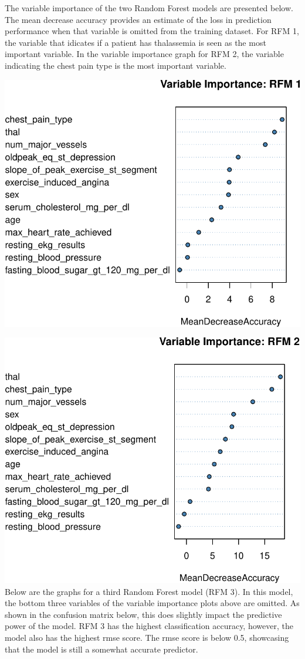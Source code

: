 \documentclass[11pt,preprint, authoryear]{elsarticle}
\numberwithin{equation}{section}
\numberwithin{figure}{section}
\numberwithin{table}{section}
\begin{document}
\newpage

The variable importance of the two Random Forest models are presented
below. The mean decrease accuracy provides an estimate of the loss in
prediction performance when that variable is omitted from the training
dataset. For RFM 1, the variable that idicates if a patient has
thalassemia is seen as the most important variable. In the variable
importance graph for RFM 2, the variable indicating the chest pain type
is the most important variable.

\includegraphics{ML_project_files/figure-latex/unnamed-chunk-13-1.pdf}

\includegraphics{ML_project_files/figure-latex/unnamed-chunk-14-1.pdf}
\newpage Below are the graphs for a third Random Forest model (RFM 3).
In this model, the bottom three variables of the variable importance
plots above are omitted. As shown in the confusion matrix below, this
does slightly impact the predictive power of the model. RFM 3 has the
highest classification accuracy, however, the model also has the highest
rmse score. The rmse score is below 0.5, showcasing that the model is
still a somewhat accurate predictor.
\end{document}
